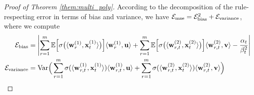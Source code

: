 \begin{proof}[Proof of Theorem \ref{them:multi_poly}]
According to the decomposition of the rule-respecting error in terms of bias and variance, we have ${\mathcal{E}}_{\rm mse} = {\mathcal{E}}_{\rm bias}^2  + {\mathcal{E}}_{\rm variance}$, where we compute 
\begin{align*}
    \gE_{\rm bias} &= \left| \sum_{r=1}^m \sE \Big[ \sigma \big( \langle \bw_r^{(1)}, \bx_t^{(1)} \rangle \big) \Big] \langle \bw_r^{(1)}, \bu \rangle + \sum_{r=1}^m \sE \Big[ \sigma \big( \langle \bw_{r,t}^{(2)} , \bx_t^{(2)} \rangle \big) \Big] \langle \bw_{r,t}^{(2)}, \bv\rangle - \frac{\alpha_t}{\beta_t^2}\right| \\
    \gE_{\rm variance} &= {\rm Var} \Big(  \sum_{r=1}^m \sigma( \langle \bw_{r,t}^{(1)}, \bx_t^{(1)} \rangle  )  \langle \bw_{r,t}^{(1)}, \bu \rangle + \sum_{r=1}^m \sigma( \langle \bw_{r,t}^{(2)}, \bx_t^{(2)} \rangle  )  \langle \bw_{r,t}^{(2)}, \bv \rangle  \Big) 

\end{align*}
\end{proof}
